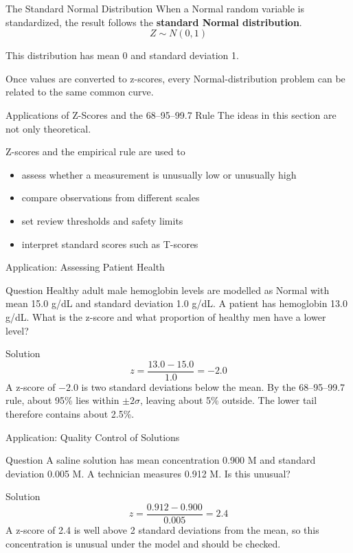 \documentclass[aspectratio=169]{beamer}
\begin{document}
\begin{frame}{The Standard Normal Distribution}
When a Normal random variable is standardized, the result follows the \textbf{standard Normal distribution}.
$$Z\sim N(0,1)$$

This distribution has mean 0 and standard deviation 1.

Once values are converted to z-scores, every Normal-distribution problem can be related to the same common curve.
\end{frame}

\begin{frame}{Applications of Z-Scores and the 68--95--99.7 Rule}
The ideas in this section are not only theoretical.

\vspace{0.15cm}
Z-scores and the empirical rule are used to
\begin{itemize}
	\item assess whether a measurement is unusually low or unusually high
	\item compare observations from different scales
	\item set review thresholds and safety limits
	\item interpret standard scores such as T-scores
\end{itemize}
\end{frame}

\begin{frame}{Application: Assessing Patient Health}
\begin{block}{Question}
Healthy adult male hemoglobin levels are modelled as Normal with mean 15.0 g/dL and standard deviation 1.0 g/dL. A patient has hemoglobin 13.0 g/dL. What is the z-score and what proportion of healthy men have a lower level?
\end{block}

\begin{block}{Solution}
$$z=\frac{13.0-15.0}{1.0}=-2.0$$
A z-score of $-2.0$ is two standard deviations below the mean. By the 68--95--99.7 rule, about 95\% lies within $\pm2\sigma$, leaving about 5\% outside. The lower tail therefore contains about 2.5\%.
\end{block}
\end{frame}

\begin{frame}{Application: Quality Control of Solutions}
\begin{block}{Question}
A saline solution has mean concentration 0.900 M and standard deviation 0.005 M. A technician measures 0.912 M. Is this unusual?
\end{block}

\begin{block}{Solution}
$$z=\frac{0.912-0.900}{0.005}=2.4$$
A z-score of 2.4 is well above 2 standard deviations from the mean, so this concentration is unusual under the model and should be checked.
\end{block}
\end{frame}
\end{document}

